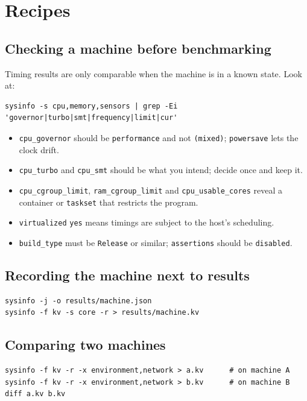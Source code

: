 \documentclass[11pt,a4paper]{article}
\newcommand{\cmd}[1]{\texttt{#1}}
\begin{document}
\section{Recipes}

\subsection{Checking a machine before benchmarking}

Timing results are only comparable when the machine is in a known state. Look at:

\begin{lstlisting}
sysinfo -s cpu,memory,sensors | grep -Ei 'governor|turbo|smt|frequency|limit|cur'
\end{lstlisting}

\begin{itemize}
  \item \texttt{cpu\_governor} should be \texttt{performance} and not \texttt{(mixed)}; \texttt{powersave} lets the clock drift.
  \item \texttt{cpu\_turbo} and \texttt{cpu\_smt} should be what you intend; decide once and keep it.
  \item \texttt{cpu\_cgroup\_limit}, \texttt{ram\_cgroup\_limit} and \texttt{cpu\_usable\_cores} reveal a container or \cmd{taskset} that
        restricts the program.
  \item \texttt{virtualized} \texttt{yes} means timings are subject to the host's scheduling.
  \item \texttt{build\_type} must be \texttt{Release} or similar; \texttt{assertions} should be \texttt{disabled}.
\end{itemize}

\subsection{Recording the machine next to results}

\begin{lstlisting}
sysinfo -j -o results/machine.json
sysinfo -f kv -s core -r > results/machine.kv
\end{lstlisting}

\subsection{Comparing two machines}

\begin{lstlisting}
sysinfo -f kv -r -x environment,network > a.kv      # on machine A
sysinfo -f kv -r -x environment,network > b.kv      # on machine B
diff a.kv b.kv
\end{lstlisting}
\end{document}
